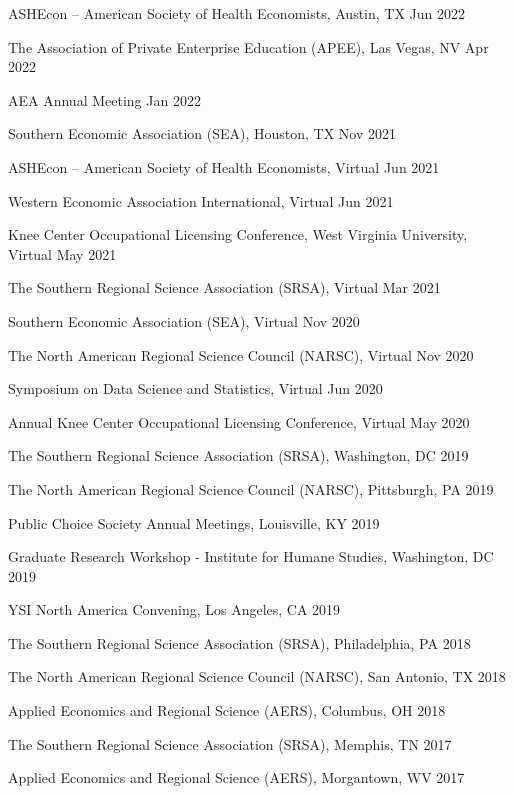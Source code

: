\begin{etaremune}
\item ASHEcon -- American Society of Health Economists, Austin, TX \hfill Jun 2022
\item The Association of Private Enterprise Education (APEE), Las Vegas, NV  \hfill Apr 2022
\item AEA Annual Meeting \hfill Jan 2022
\item Southern Economic Association (SEA), Houston, TX \hfill Nov 2021
\item ASHEcon -- American Society of Health Economists, Virtual \hfill Jun 2021
\item Western Economic Association International, Virtual \hfill Jun 2021
\item Knee Center Occupational Licensing Conference, West Virginia University, Virtual \hfill May 2021
\item The Southern Regional Science Association (SRSA), Virtual \hfill Mar 2021
\item Southern Economic Association (SEA), Virtual \hfill Nov 2020
\item The North American Regional Science Council (NARSC), Virtual \hfill Nov 2020
\item Symposium on Data Science and Statistics, Virtual \hfill Jun 2020
\item Annual Knee Center Occupational Licensing Conference, Virtual \hfill May 2020
\item The Southern Regional Science Association (SRSA), Washington, DC \hfill 2019
\item The North American Regional Science Council (NARSC), Pittsburgh, PA \hfill 2019
\item Public Choice Society Annual Meetings, Louisville, KY \hfill 2019
\item Graduate Research Workshop - Institute for Humane Studies, Washington, DC \hfill 2019
\item YSI North America Convening, Los Angeles, CA \hfill 2019
\item The Southern Regional Science Association (SRSA), Philadelphia, PA \hfill 2018
\item The North American Regional Science Council (NARSC), San Antonio, TX \hfill 2018
\item Applied Economics and Regional Science (AERS), Columbus, OH \hfill 2018
\item The Southern Regional Science Association (SRSA), Memphis, TN \hfill 2017
\item Applied Economics and Regional Science (AERS), Morgantown, WV \hfill 2017
\end{etaremune}

